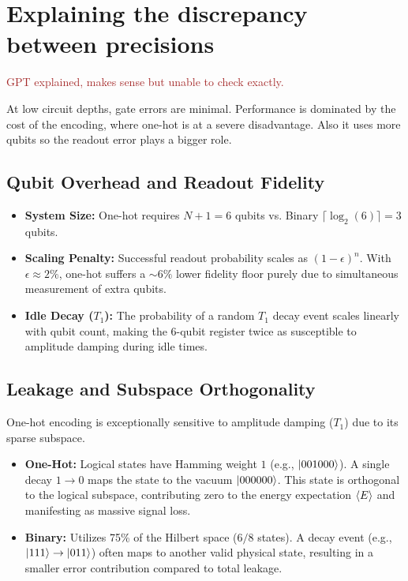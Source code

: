 \documentclass[%
nofootinbib,
 amsmath,amssymb,
 aps,
 prd,
10pt]{revtex4-2}
\newcommand{\brown}[1]{\textcolor{brown}{#1}}
\begin{document}
\section{Explaining the discrepancy between precisions}
\brown{GPT explained, makes sense but unable to check exactly.}

At low circuit depths, gate errors are minimal. Performance is dominated by the cost of the encoding, where one-hot is at a severe disadvantage. Also it uses more qubits so the readout error plays a bigger role.

\subsection{Qubit Overhead and Readout Fidelity}
\begin{itemize}
    \item \textbf{System Size:} One-hot requires $N+1=6$ qubits vs. Binary $\lceil \log_2(6) \rceil = 3$ qubits.
    \item \textbf{Scaling Penalty:} Successful readout probability scales as $(1-\epsilon)^n$. With $\epsilon \approx 2\%$, one-hot suffers a $\sim 6\%$ lower fidelity floor purely due to simultaneous measurement of extra qubits.
    \item \textbf{Idle Decay ($T_1$):} The probability of a random $T_1$ decay event scales linearly with qubit count, making the 6-qubit register twice as susceptible to amplitude damping during idle times.
\end{itemize}

\subsection{Leakage and Subspace Orthogonality}
One-hot encoding is exceptionally sensitive to amplitude damping ($T_1$) due to its sparse subspace.
\begin{itemize}
    \item \textbf{One-Hot:} Logical states have Hamming weight $1$ (e.g., $\ket{001000}$). A single decay $1 \to 0$ maps the state to the vacuum $\ket{000000}$. This state is orthogonal to the logical subspace, contributing zero to the energy expectation $\braket{E}$ and manifesting as massive signal loss.
    \item \textbf{Binary:} Utilizes 75\% of the Hilbert space ($6/8$ states). A decay event (e.g., $\ket{111} \to \ket{011}$) often maps to another valid physical state, resulting in a smaller error contribution compared to total leakage.
\end{itemize}
\end{document}
